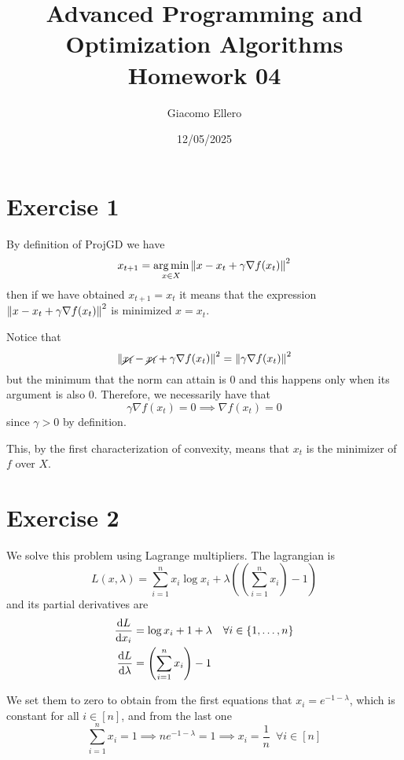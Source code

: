 \documentclass[12pt]{extarticle}
\title{Advanced Programming and Optimization Algorithms \\ Homework 04}
\author{Giacomo Ellero}
\date{12/05/2025}
\numberwithin{equation}{section}
\begin{document}
\maketitle

\section*{Exercise 1}

By definition of ProjGD we have
\begin{equation}
	x_{t+1} = \operatorname*{arg\,min}_{x\in X} \norm{x - x_t + \gamma \nabla f(x_t)}^2
\end{equation}
then if we have obtained $x_{t+1} = x_t$ it means that the expression
$\norm{x - x_t + \gamma \nabla f(x_t)}^2$ is minimized $x = x_t$.

Notice that
\begin{equation}
	\norm{\cancel {x_t} - \cancel{x_t} + \gamma \nabla f(x_t)}^2 =
	\norm{\gamma \nabla f(x_t)}^2
\end{equation}
but the minimum that the norm can attain is $0$ and this happens only when its argument is also $0$.
Therefore, we necessarily have that
\begin{equation}
	\gamma \nabla f(x_t) = 0 \implies \nabla f(x_t) = 0
\end{equation}
since $\gamma > 0$ by definition.

This, by the first characterization of convexity, means that $x_t$ is the minimizer of $f$ over $X$.

\section*{Exercise 2}

We solve this problem using Lagrange multipliers.
The lagrangian is
\begin{equation}
	L(x, \lambda) = \sum_{i = 1}^n x_i \log x_i +
	\lambda \left( \left(\sum_{i = 1}^n x_i \right) - 1 \right)
\end{equation}
and its partial derivatives are
\begin{align}
	\dv{L}{x_i}     & = \log x_i + 1 + \lambda                  & \forall i \in \{1, \dots, n \} \\
	\dv{L}{\lambda} & = \left( \sum_{i = 1}^{n} x_i \right) - 1
\end{align}

We set them to zero to obtain from the first equations that $x_i = e^{-1-\lambda}$,
which is constant for all $i \in [n]$, and from the last one
\begin{equation}
	\sum_{i = 1}^{n} x_i = 1 \implies n e^{-1-\lambda} = 1 \implies x_i
	= \frac{1}{n} \enspace \forall i \in [n]
\end{equation}
\end{document}
